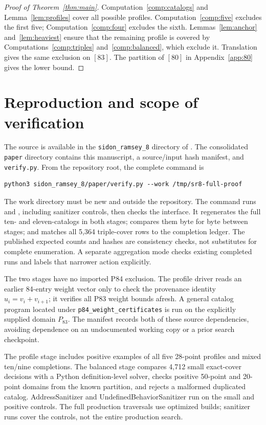 \documentclass[11pt]{article}
\begin{document}
\begin{proof}[Proof of Theorem~\ref{thm:main}]
Computation~\ref{comp:catalogs} and Lemma~\ref{lem:profiles} cover all
possible profiles. Computation~\ref{comp:five} excludes the first five;
Computation~\ref{comp:four} excludes the sixth. Lemmas~\ref{lem:anchor}
and~\ref{lem:heaviest} ensure that the remaining profile is covered by
Computations~\ref{comp:triples} and~\ref{comp:balanced}, which exclude it.
Translation gives the same exclusion on $[83]$. The partition of $[80]$
in Appendix~\ref{app:80} gives the lower bound.
\end{proof}

\section{Reproduction and scope of verification}\label{sec:repro}
The source is available in the \texttt{sidon\_ramsey\_8} directory of
\cite{source}. The consolidated \texttt{paper} directory contains this
manuscript, a source/input hash manifest, and \texttt{verify.py}.
From the repository root, the complete command is
\begin{verbatim}
python3 sidon_ramsey_8/paper/verify.py --work /tmp/sr8-full-proof
\end{verbatim}
The work directory must be new and outside the repository. The command
runs  and
, including sanitizer controls, then
checks the interface. It regenerates the full ten- and eleven-catalogs
in both stages; compares them byte for byte between stages; and matches
all 5,364 triple-cover rows to the completion ledger. The published
expected counts and hashes are consistency checks, not substitutes for
complete enumeration. A separate aggregation mode checks existing
completed runs and labels that narrower action explicitly.

The two stages have no imported P84 exclusion. The profile driver reads
an earlier 84-entry weight vector only to check the provenance identity
$u_i=v_i+v_{i+1}$; it verifies all P83 weight bounds afresh. A general
catalog program located under \texttt{p84\_weight\_certificates} is run
on the explicitly supplied domain $P_{83}$. The manifest records both
of these source dependencies, avoiding dependence on an undocumented
working copy or a prior search checkpoint.

The profile stage includes positive examples of all five 28-point
profiles and mixed ten/nine completions. The balanced stage compares
4,712 small exact-cover decisions with a Python definition-level
solver, checks positive 50-point and 20-point domains from the known
partition, and rejects a malformed duplicated catalog. AddressSanitizer
and UndefinedBehaviorSanitizer run on the small and positive controls.
The full production traversals use optimized builds; sanitizer runs
cover the controls, not the entire production search.
\end{document}
